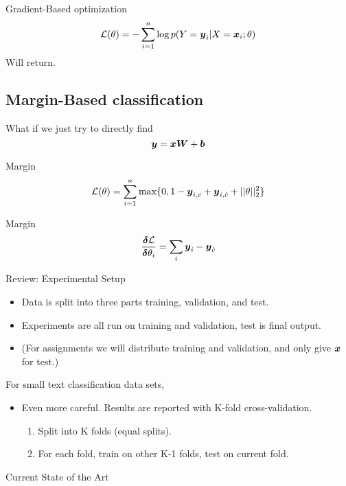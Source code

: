 \documentclass{beamer}
\begin{document}
\begin{frame}{Gradient-Based optimization}
  \[ \mathcal{L}(\theta) = - \sum_{i=1}^n \log p(Y = \boldsymbol{y}_i | X = \boldsymbol{x}_i; \theta) \] 
  Will return.
\end{frame}

\subsection{Margin-Based classification}
\begin{frame}{}
  What if we just try to directly find 
     \[\boldsymbol{y} = \boldsymbol{x} \boldsymbol{W} + \boldsymbol{b}\]   
    
\end{frame}


\begin{frame}{Margin}
    \[ \mathcal{L}(\theta) = \sum_{i=1}^n \max\{0, 1 - \boldsymbol{y}_{i,c} + \boldsymbol{y}_{i, \hat{c}} + ||\theta||^2_2\} \]
\end{frame}


\begin{frame}{Margin}
  \[\frac{\boldsymbol{\delta} \mathcal{L}}{\boldsymbol{\delta} \theta_i} = \sum_i \boldsymbol{y}_i - \boldsymbol{y}_{\hat{c}}  \]
\end{frame}

\begin{frame}{Review: Experimental Setup}
  
  \begin{itemize}
  \item Data is split into three parts training, validation, and test.
  \item Experiments are all run on training and validation, test is final output.

  \item (For assignments we will distribute training and validation, and only give $\boldsymbol{x}$ for test.)
  \end{itemize}
  
  For small text classification data sets,
  \begin{itemize}
  \item Even more careful. Results are reported with K-fold cross-validation. 
    \begin{enumerate}
    \item Split into K folds (equal splits).
    \item For each fold, train on other K-1 folds, test on current fold. 
    \end{enumerate}
  \end{itemize}
\end{frame}


\begin{frame}{Current State of the Art} 
  
\end{frame}
\end{document}
